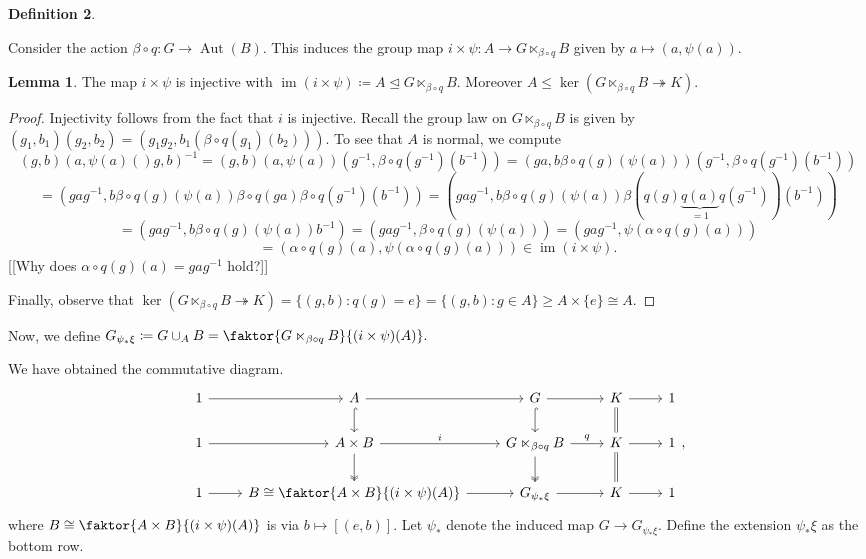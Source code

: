 \documentclass[10pt,letterpaper,cm]{nupset}
\theoremstyle{definition}
\newtheorem{definition}{Definition}[subsection]
\theoremstyle{theorem}
\newtheorem{lemma}[definition]{Lemma}
\theoremstyle{remark}
\newcommand{\1}{\mathbf{1}}
\newcommand{\0}{\vec 0}
\DeclareMathOperator{\aut}{Aut}
\DeclareMathOperator{\im}{im}
\begin{document}
\begin{definition}
\begin{enumerate}
Consider the action $\beta \circ q : G \to \aut(B)$. This induces the group map $i \times \psi : A \to G \ltimes_{\beta \circ q} B$ given by $a \mapsto (a, \psi(a))$.
\begin{lemma}
The map $i \times \psi$ is injective with $\im (i \times \psi)\coloneqq  A \unlhd G \ltimes_{\beta \circ q} B$. Moreover $A \leq \ker (G\ltimes_{\beta \circ q} B \twoheadrightarrow K)$.
\end{lemma}
\begin{proof}
Injectivity follows from the fact that $i$ is injective. Recall the group law on $G \ltimes_{\beta \circ q} B$ is given by $(g_1, b_1)(g_2, b_2) = (g_1g_2, b_1(\beta \circ q(g_1)(b_2)))$. To see that $A$ is normal, we compute
$$(g, b)(a, \psi(a)()g,b)^{-1} = (g, b)(a, \psi(a) )(g^{-1}, \beta \circ q(g^{-1})(b^{-1})) = (ga, b\beta \circ q(g)(\psi(a)))(g^{-1}, \beta \circ q(g^{-1})(b^{-1}))$$ $$ = (gag^{-1}, b\beta \circ q(g)(\psi(a))\beta \circ q(ga)\beta \circ q(g^{-1})(b^{-1})) = (gag^{-1}, b\beta \circ q(g)(\psi(a)) \beta (q(g)\underbrace{q(a)}_{=1}q(g^{-1}))(b^{-1}))$$
$$=  (gag^{-1}, b\beta \circ q(g)(\psi(a))b^{-1}) = (gag^{-1}, \beta \circ q(g)(\psi(a))) = (gag^{-1}, \psi(\alpha \circ q(g)(a))) $$ $$ = (\alpha \circ q(g)(a),  \psi(\alpha \circ q(g)(a))) \in \im(i \times \psi).$$ {[[Why does $\alpha \circ q(g)(a) = gag^{-1}$ hold?]]}

Finally, observe that $\ker (G\ltimes_{\beta \circ q} B \twoheadrightarrow K) = \{(g, b) : q(g) =e\} = \{(g, b) : g \in A\} \geq A\times \{e\} \cong A$. 
\end{proof}
Now, we define $G_{\psi_{\ast}\xi} \coloneqq  G \cup_A B = \faktor{G\ltimes_{\beta \circ q} B}{(i\times \psi)(A)}.$ 

We have obtained the commutative diagram.
\[
\begin{tikzcd}
1 \arrow[r] & A \arrow[d, hook] \arrow[r] & G \arrow[d, hook] \arrow[r] & K \arrow[d, equal] \arrow[r] & 1 \\
1 \arrow[r] & A\times B \arrow[r, "i"] \arrow[d, two heads] & G \ltimes_{\beta \circ q} B \arrow[r, "q"] \arrow[d, two heads] & K \arrow[r] \arrow[d, equal] & 1 \\
1 \arrow[r] & B \cong \faktor{A\times B}{(i\times \psi)(A)} \arrow[r] & G_{\psi_{\ast}\xi} \arrow[r] & K \arrow[r] & 1
\end{tikzcd},
\]
where $B \cong \faktor{A\times B}{(i\times \psi)(A)}$ is via  $b \mapsto [(e, b)]$. Let $\psi_{\ast}$ denote the induced map $G \to G_{\psi_{\ast} \xi}$. Define the extension $\psi_{\ast}\xi$ as the bottom row.


\end{enumerate}
\end{definition}
\end{document}

